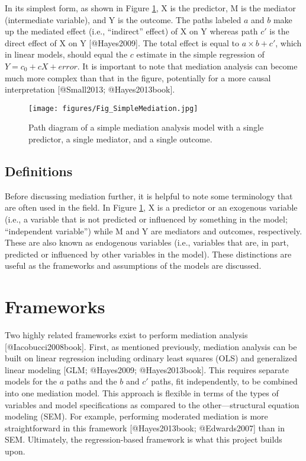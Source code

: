 \documentclass[]{article}
\begin{document}
In its simplest form, as shown in Figure \ref{fig:simplemed}, X is the
predictor, M is the mediator (intermediate variable), and Y is the
outcome. The paths labeled \(a\) and \(b\) make up the mediated effect
(i.e., ``indirect'' effect) of X on Y whereas path \(c'\) is the direct
effect of X on Y {[}@Hayes2009{]}. The total effect is equal to
\(a \times b + c'\), which in linear models, should equal the \(c\)
estimate in the simple regression of \(Y = c_0 + cX + error\). It is
important to note that mediation analysis can become much more complex
than that in the figure, potentially for a more causal interpretation
{[}@Small2013; @Hayes2013book{]}.

\begin{figure}
  \centering
  \texttt{[image: figures/Fig\_SimpleMediation.jpg]}
  \caption{Path diagram of a simple mediation analysis model with a single predictor, a single mediator, and a single outcome.}
  \label{fig:simplemed}
\end{figure}

\subsection{Definitions}\label{definitions}

Before discussing mediation further, it is helpful to note some
terminology that are often used in the field. In Figure
\ref{fig:simplemed}, X is a predictor or an exogenous variable (i.e., a
variable that is not predicted or influenced by something in the model;
``independent variable'') while M and Y are mediators and outcomes,
respectively. These are also known as endogenous variables (i.e.,
variables that are, in part, predicted or influenced by other variables
in the model). These distinctions are useful as the frameworks and
assumptions of the models are discussed.

\section{Frameworks}\label{frameworks}

Two highly related frameworks exist to perform mediation analysis
{[}@Iacobucci2008book{]}. First, as mentioned previously, mediation
analysis can be built on linear regression including ordinary least
squares (OLS) and generalized linear modeling {[}GLM; @Hayes2009;
@Hayes2013book{]}. This requires separate models for the \(a\) paths and
the \(b\) and \(c'\) paths, fit independently, to be combined into one
mediation model. This approach is flexible in terms of the types of
variables and model specifications as compared to the other---structural
equation modeling (SEM). For example, performing moderated mediation is
more straightforward in this framework {[}@Hayes2013book;
@Edwards2007{]} than in SEM. Ultimately, the regression-based framework
is what this project builds upon.
\end{document}
